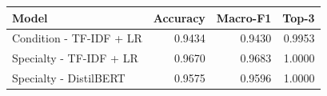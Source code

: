 \begin{tabular}{lrrr}
\hline
Model & Accuracy & Macro-F1 & Top-3 \\
\hline
Condition - TF-IDF + LR & 0.9434 & 0.9430 & 0.9953 \\
Specialty - TF-IDF + LR & 0.9670 & 0.9683 & 1.0000 \\
Specialty - DistilBERT & 0.9575 & 0.9596 & 1.0000 \\
\hline
\end{tabular}
